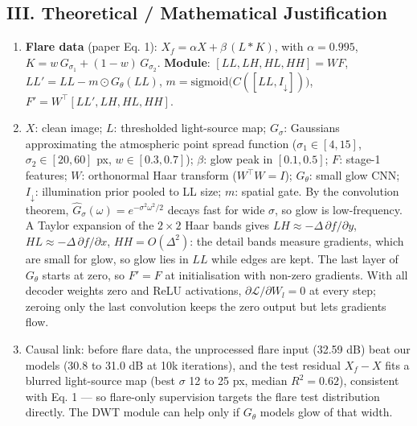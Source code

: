 \documentclass[8pt,a4paper]{article}
\begin{document}
\subsection*{III. Theoretical / Mathematical Justification}
\begin{enumerate}
    \item \textbf{Flare data} (paper Eq. 1): $X_f = \alpha X + \beta\,(L * K)$, with $\alpha = 0.995$, $K = w\,G_{\sigma_1} + (1-w)\,G_{\sigma_2}$. \textbf{Module}: $[LL, LH, HL, HH] = W F$, \; $LL' = LL - m \odot G_\theta(LL)$, \; $m = \mathrm{sigmoid}\big(C([LL, I_{\downarrow}])\big)$, \; $F' = W^{\top}[LL', LH, HL, HH]$.
    \item $X$: clean image; $L$: thresholded light-source map; $G_\sigma$: Gaussians approximating the atmospheric point spread function ($\sigma_1 \in [4,15]$, $\sigma_2 \in [20,60]$ px, $w \in [0.3,0.7]$); $\beta$: glow peak in $[0.1, 0.5]$; $F$: stage-1 features; $W$: orthonormal Haar transform ($W^{\top}W = I$); $G_\theta$: small glow CNN; $I_{\downarrow}$: illumination prior pooled to LL size; $m$: spatial gate. By the convolution theorem, $\hat{G}_\sigma(\omega) = e^{-\sigma^2\omega^2/2}$ decays fast for wide $\sigma$, so glow is low-frequency. A Taylor expansion of the $2\times2$ Haar bands gives $LH \approx -\Delta\,\partial f/\partial y$, $HL \approx -\Delta\,\partial f/\partial x$, $HH = O(\Delta^2)$: the detail bands measure gradients, which are small for glow, so glow lies in $LL$ while edges are kept. The last layer of $G_\theta$ starts at zero, so $F' = F$ at initialisation with non-zero gradients. With all decoder weights zero and ReLU activations, $\partial \mathcal{L}/\partial W_l = 0$ at every step; zeroing only the last convolution keeps the zero output but lets gradients flow.
    \item Causal link: before flare data, the unprocessed flare input (32.59 dB) beat our models (30.8 to 31.0 dB at 10k iterations), and the test residual $X_f - X$ fits a blurred light-source map (best $\sigma$ 12 to 25 px, median $R^2 = 0.62$), consistent with Eq. 1 — so flare-only supervision targets the flare test distribution directly. The DWT module can help only if $G_\theta$ models glow of that width.
\end{enumerate}

\end{document}
